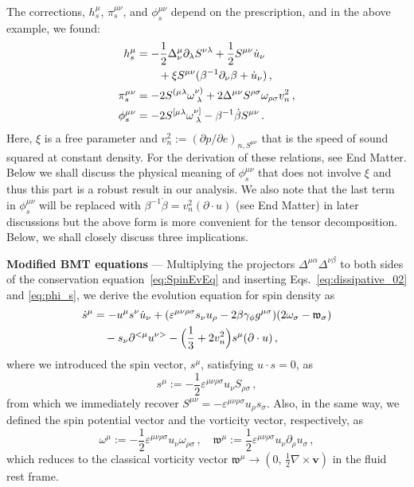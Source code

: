 \documentclass[prl,superscriptaddress,twocolumn,
  showpacs,preprintnumbers,amsmath,amssymb]{revtex4-1}
\newcommand{\p}{\partial}
\newcommand{\vOmega}{\mathfrak{w}}
\newcommand{\bv}{{\bm v}}
\begin{document}
The corrections, $h_s^\mu$, $\pi_s^{\mu\nu}$, and $\phi_s^{\mu\nu}$ depend on the prescription, and in the above example, we found:
\begin{subequations}
  \begin{align}
  h_s^\mu
  &= -\frac{1}{2} \Delta^\mu_\nu \partial_\lambda S^{\nu\lambda}
    + \frac{1}{2} S^{\mu\nu}\dot{u}_\nu \notag\\
  & \qquad + \xi S^{\mu\nu}(\beta^{-1}\partial_\nu\beta + \dot{u}_\nu)\,,\\
  \pi_s^{\mu\nu}
  &= -2S^{(\mu\lambda} \omega^{\nu)}_{\;\lambda}
    + 2
    \Delta^{\mu\nu} S^{\rho\sigma}\omega_{\rho\sigma} v_n^2\,,\\
  \phi_s^{\mu\nu}
  &= -2S^{[\mu\lambda} \omega^{\nu]}_{\;\lambda}
    - \beta^{-1}\dot{\beta} S^{\mu\nu}\,.
    \label{eq:phi_s}
  \end{align}
\end{subequations}
Here, $\xi$ is a free parameter and $v_n^2:=(\p p/\p e)_{n,S^{\mu\nu}}$ that is the speed of sound squared at constant density.  For the derivation of these relations, see End Matter.  Below we shall discuss the physical meaning of $\phi_s^{\mu\nu}$ that does not involve $\xi$ and thus this part is a robust result in our analysis.  We also note that the last term in $\phi_s^{\mu\nu}$ will be replaced with $\beta^{-1}\dot{\beta}=v_n^2 (\partial\cdot u)$ (see End Matter) in later discussions but the above form is more convenient for the tensor decomposition.  Below, we shall closely discuss three implications.
\vspace{0.5em}



\noindent
\textbf{Modified BMT equations}
---
Multiplying the projectors $\Delta^{\mu\alpha}\Delta^{\nu\beta}$ to both sides of the conservation equation~\eqref{eq:SpinEvEq} and inserting Eqs.~\eqref{eq:dissipative_02} and \eqref{eq:phi_s}, we derive the evolution equation for spin density as
\begin{align}
  \dot{s}^\mu & = -u^\mu s^\nu \dot{u}_\nu
    + (\varepsilon^{\mu\nu\rho\sigma} s_\nu u_\rho - 2\beta\gamma_\phi g^{\mu\sigma}) (2\omega_\sigma - \vOmega_\sigma) \notag \\
   &\quad -s_\nu \partial^{<\mu}u^{\nu>} - \Bigl( \frac{1}{3} + 2v_n^2 \Bigr) s^\mu(\partial\cdot u) \,,
   \label{eq:MOdifiedBMT}
\end{align}
where we introduced the spin vector, $s^\mu$, satisfying $u\cdot s=0$, as
\begin{equation}
  s^\mu := -\frac{1}{2}\varepsilon^{\mu\nu\rho\sigma}
  u_\nu S_{\rho\sigma}\,,
\end{equation}
from which we immediately recover $S^{\mu\nu} = -\varepsilon^{\mu\nu\rho\sigma} u_\rho s_\sigma$.  Also, in the same way, we defined the spin potential vector and the vorticity vector, respectively, as
\begin{equation}
    \omega^{\mu} := -\frac{1}{2}  \varepsilon^{\mu\nu\rho\sigma} u_\nu \omega_{\rho\sigma}\,,\quad
    \vOmega^{\mu} := \frac{1}{2}\varepsilon^{\mu\nu\rho\sigma}u_{\nu}\partial_{\rho}u_{\sigma}\,,
\end{equation}
which reduces to the classical
vorticity vector $\vOmega^{\mu}\rightarrow(0,\,\frac{1}{2}\nabla\times\bv)$
in the fluid rest frame.
\end{document}
